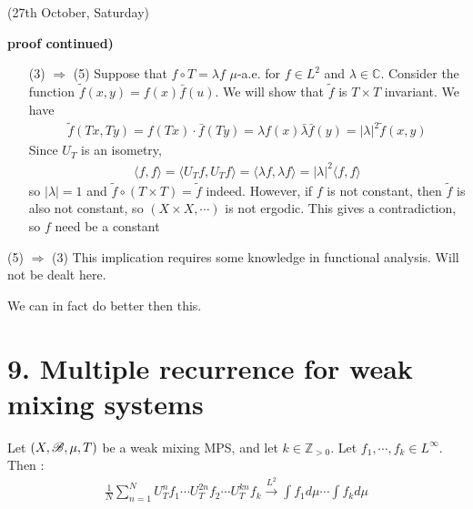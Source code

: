 \documentclass[12pt,a4paper]{report}
\newenvironment{proof}
{\begin{changemargin}{1cm}{0.5cm} 
	}%
	{\end{changemargin}
}
\begin{document}
\newday

(27th October, Saturday)
\s

\begin{proof}
\textbf{proof continued)} \begin{itemize}
\item[(3) $\Rightarrow$ (5)] Suppose that $f\circ T = \lambda f$ $\mu$-a.e. for $f\in L^2$ and $\lambda \in \mathbb{C}$. Consider the function $\tilde{f}(x,y) = f(x)\bar{f}(u)$. We will show that $\tilde{f}$ is $T \times T$ invariant. We have
\begin{align*}
\tilde{f}(Tx,Ty) = f(Tx) \cdot \bar{f}(Ty) = \lambda f(x) \bar{\lambda} \bar{f}(y) = |\lambda|^2 \tilde{f}(x,y)
\end{align*}
Since $U_T$ is an isometry,
\begin{align*}
\langle f, f \rangle = \langle U_T f, U_T f\rangle = \langle \lambda f , \lambda f\rangle = |\lambda|^2 \langle f,f\rangle
\end{align*}
so $|\lambda| =1$ and $\tilde{f} \circ (T \times T) = \tilde{f}$ indeed. However, if $f$ is not constant, then $\tilde{f}$ is also not constant, so $(X\times X, \cdots)$ is not ergodic. This gives a contradiction, so $f$ need be a constant
\end{itemize}
\s

\item[(5) $\Rightarrow$ (3)] This implication requires some knowledge in functional analysis. Will not be dealt here.

\eop
\end{proof}
\s

We can in fact do better then this.
\s

\section*{9. Multiple recurrence for weak mixing systems}

\thm Let $(X,\mathscr{B}, \mu, T)$ be a weak mixing MPS, and let $k\in \mathbb{Z}_{>0}$. Let $f_1,\cdots,f_k \in L^{\infty}$. Then :
\begin{align*}
\frac{1}{N} \sum_{n=1}^N U^n_T f_1 \cdots U^{2n}_T f_2 \cdots U^{kn}_T f_k \xrightarrow{L^2} \int f_1 d\mu \cdots \int f_{k} d\mu
\end{align*}
\s
\end{document}
